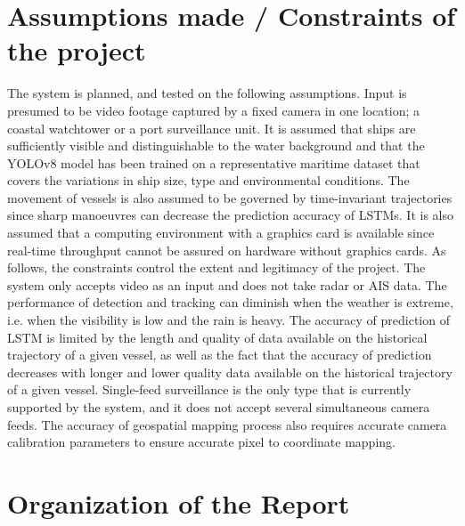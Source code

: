 \section[Assumptions made / Constraints of the project]{\textbf{Assumptions made / Constraints of the project}}


The system is planned, and tested on the following assumptions. Input is presumed to be video footage captured by a fixed camera in one location; a coastal watchtower or a port surveillance unit. It is assumed that ships are sufficiently visible and distinguishable to the water background and that the YOLOv8 model has been trained on a representative maritime dataset that covers the variations in ship size, type and environmental conditions. The movement of vessels is also assumed to be governed by time-invariant trajectories since sharp manoeuvres can decrease the prediction accuracy of LSTMs. It is also assumed that a computing environment with a graphics card is available since real-time throughput cannot be assured on hardware without graphics cards.
As follows, the constraints control the extent and legitimacy of the project. The system only accepts video as an input and does not take radar or AIS data. The performance of detection and tracking can diminish when the weather is extreme, i.e. when the visibility is low and the rain is heavy. The accuracy of prediction of LSTM is limited by the length and quality of data available on the historical trajectory of a given vessel, as well as the fact that the accuracy of prediction decreases with longer and lower quality data available on the historical trajectory of a given vessel. Single-feed surveillance is the only type that is currently supported by the system, and it does not accept several simultaneous camera feeds. The accuracy of geospatial mapping process also requires accurate camera calibration parameters to ensure accurate pixel to coordinate mapping.


\section[Organization of the Report]{\textbf{Organization of the Report}}


